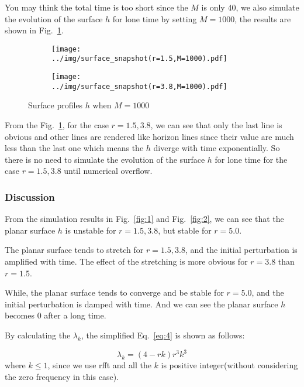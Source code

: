 \documentclass[runningheads]{llncs}
\begin{document}
You may think the total time is too short since the $M$ is only $40$, 
we also simulate the evolution of the surface $h$ for lone time by setting $M=1000$, the results are shown in Fig.~\ref{fig:3}.

\begin{figure}[!htbp]
    \centering
    \begin{subfigure}{.4\textwidth}
        \centering
        \texttt{[image: ../img/surface\_snapshot(r=1.5,M=1000).pdf]}  
    \end{subfigure}
    \begin{subfigure}{.4\textwidth}
        \centering
        \texttt{[image: ../img/surface\_snapshot(r=3.8,M=1000).pdf]}  
    \end{subfigure}
    \caption{Surface profiles $h$ when $M=1000$}
    \label{fig:3}
\end{figure}
From the Fig.~\ref{fig:3}, for the case $r=1.5,3.8$, we can see that only the last line is obvious 
and other lines are rendered like horizon lines since their value are much less than the last one which means the $h$ diverge with time exponentially.
So there is no need to simulate the evolution of the surface $h$ for lone time for the case $r=1.5,3.8$ until numerical overflow.

\subsubsection{Discussion}
From the simulation results in Fig.~\ref{fig:1} and Fig.~\ref{fig:2}, we can see that the planar surface $h$ is unstable for $r=1.5,3.8$, but stable for $r=5.0$.

The planar surface tends to stretch for $r=1.5,3.8$, and the initial perturbation is amplified with time.
The effect of the stretching is more obvious for $r=3.8$ than $r=1.5$.

While, the planar surface tends to converge and be stable for $r=5.0$, and the initial perturbation is damped with time.
And we can see the planar surface $h$ becomes $0$ after a long time.

By calculating the $\lambda_k$, the simplified Eq.~\eqref{eq:4} is shown as follows:

\begin{equation}
    \label{eq:4}
    \lambda_k = (4-rk)r^3k^3
\end{equation}
where $k \leq 1$, since we use rfft and all the $k$ is positive integer(without considering the zero frequency in this case).
\end{document}

